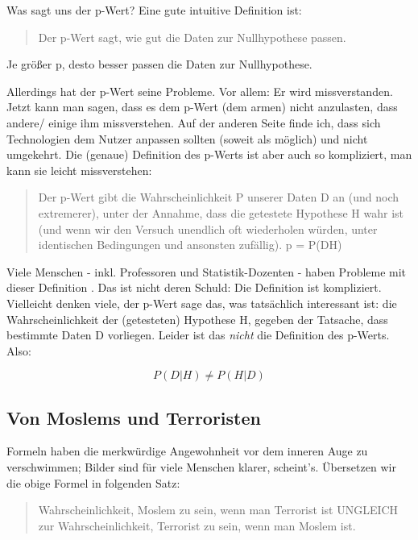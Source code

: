 \documentclass[12pt,ngerman,]{book}
\begin{document}
Was sagt uns der p-Wert? Eine gute intuitive Definition ist:

\begin{quote}
Der p-Wert sagt, wie gut die Daten zur Nullhypothese passen.
\end{quote}

Je größer p, desto besser passen die Daten zur Nullhypothese.

Allerdings hat der p-Wert seine Probleme. Vor allem: Er wird
missverstanden. Jetzt kann man sagen, dass es dem p-Wert (dem armen)
nicht anzulasten, dass andere/ einige ihm missverstehen. Auf der anderen
Seite finde ich, dass sich Technologien dem Nutzer anpassen sollten
(soweit als möglich) und nicht umgekehrt. Die (genaue) Definition des
p-Werts ist aber auch so kompliziert, man kann sie leicht missverstehen:

\begin{quote}
Der p-Wert gibt die Wahrscheinlichkeit P unserer Daten D an (und noch
extremerer), unter der Annahme, dass die getestete Hypothese H wahr ist
(und wenn wir den Versuch unendlich oft wiederholen würden, unter
identischen Bedingungen und ansonsten zufällig). p = P(D\textbar{}H)
\end{quote}

Viele Menschen - inkl. Professoren und Statistik-Dozenten - haben
Probleme mit dieser Definition \citep{Gigerenzer2004}. Das ist nicht
deren Schuld: Die Definition ist kompliziert. Vielleicht denken viele,
der p-Wert sage das, was tatsächlich interessant ist: die
Wahrscheinlichkeit der (getesteten) Hypothese H, gegeben der Tatsache,
dass bestimmte Daten D vorliegen. Leider ist das \emph{nicht} die
Definition des p-Werts. Also:

\[ P(D|H) \ne P(H|D) \]

\subsection{Von Moslems und
Terroristen}\label{von-moslems-und-terroristen}

Formeln haben die merkwürdige Angewohnheit vor dem inneren Auge zu
verschwimmen; Bilder sind für viele Menschen klarer, scheint's.
Übersetzen wir die obige Formel in folgenden Satz:

\begin{quote}
Wahrscheinlichkeit, Moslem zu sein, wenn man Terrorist ist UNGLEICH zur
Wahrscheinlichkeit, Terrorist zu sein, wenn man Moslem ist.
\end{quote}
\end{document}
